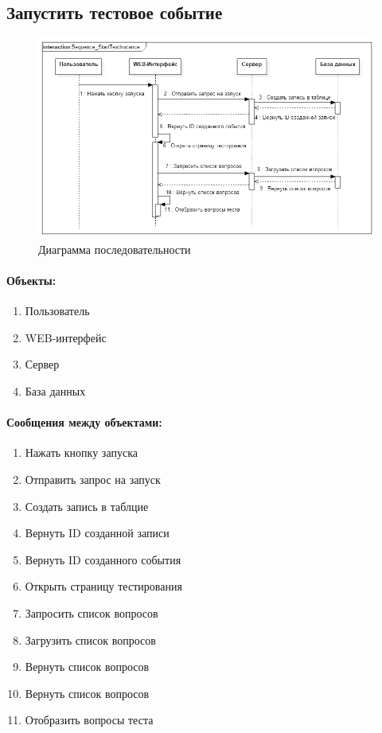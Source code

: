 \documentclass{article}
\begin{document}
    \subsection{Запустить тестовое событие}
        \begin{figure}[H]
            \includegraphics[width=\textwidth, center]
                {Sequence_StartTestInstance}
            \caption{Диаграмма последовательности}
        \end{figure}
        \paragraph{Объекты:}
        \begin{enumerate}
            \item Пользователь
            \item WEB-интерфейс
            \item Сервер
            \item База данных
        \end{enumerate}
        \paragraph{Сообщения между объектами:}
        \begin{enumerate}
            \item Нажать кнопку запуска
            \item Отправить запрос на запуск
            \item Создать запись в таблцие
            \item Вернуть ID созданной записи
            \item Вернуть ID созданного события
            \item Открыть страницу тестирования
            \item Запросить список вопросов
            \item Загрузить список вопросов
            \item Вернуть список вопросов
            \item Вернуть список вопросов
            \item Отобразить вопросы теста
        \end{enumerate}
\end{document}
